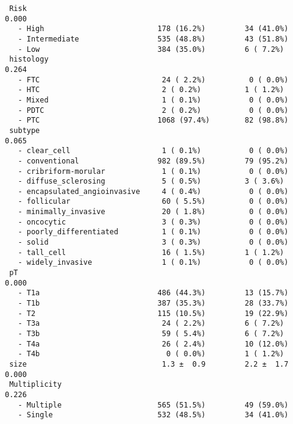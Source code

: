 \documentclass[
  letterpaper,
  DIV=11,
  numbers=noendperiod]{scrartcl}
\begin{document}
\begin{verbatim}
 Risk                                                                 0.000
   - High                          178 (16.2%)         34 (41.0%)          
   - Intermediate                  535 (48.8%)         43 (51.8%)          
   - Low                           384 (35.0%)         6 ( 7.2%)           
 histology                                                            0.264
   - FTC                            24 ( 2.2%)          0 ( 0.0%)          
   - HTC                            2 ( 0.2%)          1 ( 1.2%)           
   - Mixed                          1 ( 0.1%)           0 ( 0.0%)          
   - PDTC                           2 ( 0.2%)           0 ( 0.0%)          
   - PTC                           1068 (97.4%)        82 (98.8%)          
 subtype                                                              0.065
   - clear_cell                     1 ( 0.1%)           0 ( 0.0%)          
   - conventional                  982 (89.5%)         79 (95.2%)          
   - cribriform-morular             1 ( 0.1%)           0 ( 0.0%)          
   - diffuse_sclerosing             5 ( 0.5%)          3 ( 3.6%)           
   - encapsulated_angioinvasive     4 ( 0.4%)           0 ( 0.0%)          
   - follicular                     60 ( 5.5%)          0 ( 0.0%)          
   - minimally_invasive             20 ( 1.8%)          0 ( 0.0%)          
   - oncocytic                      3 ( 0.3%)           0 ( 0.0%)          
   - poorly_differentiated          1 ( 0.1%)           0 ( 0.0%)          
   - solid                          3 ( 0.3%)           0 ( 0.0%)          
   - tall_cell                      16 ( 1.5%)         1 ( 1.2%)           
   - widely_invasive                1 ( 0.1%)           0 ( 0.0%)          
 pT                                                                   0.000
   - T1a                           486 (44.3%)         13 (15.7%)          
   - T1b                           387 (35.3%)         28 (33.7%)          
   - T2                            115 (10.5%)         19 (22.9%)          
   - T3a                            24 ( 2.2%)         6 ( 7.2%)           
   - T3b                            59 ( 5.4%)         6 ( 7.2%)           
   - T4a                            26 ( 2.4%)         10 (12.0%)          
   - T4b                             0 ( 0.0%)         1 ( 1.2%)           
 size                               1.3 ±  0.9         2.2 ±  1.7     0.000
 Multiplicity                                                         0.226
   - Multiple                      565 (51.5%)         49 (59.0%)          
   - Single                        532 (48.5%)         34 (41.0%)          

\end{verbatim}
\end{document}
